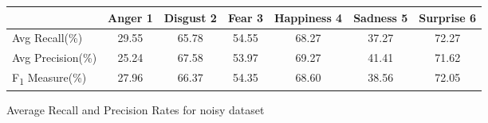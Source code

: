\begin{figure}[h]
\begin{center}
\caption{Average Recall and Precision Rates for noisy dataset}
\begin{tabular}{ | l || c | c | c | c | c | c | }
    \hline
          & Anger 1 & Disgust 2 & Fear 3 & Happiness 4 & Sadness 5 & Surprise 6 \\ \hline \hline
        Avg Recall(\%) & 29.55 & 65.78 & 54.55 & 68.27 & 37.27 & 72.27 \\ \hline
        Avg Precision(\%) & 25.24 & 67.58 & 53.97 & 69.27 & 41.41 & 71.62 \\ \hline
        F\textsubscript{1} Measure(\%) & 27.96 & 66.37 & 54.35 & 68.60 & 38.56 & 72.05 \\ \hline
    \end{tabular}
    \label{fig:averageRecall}
\end{center}
\end{figure}
